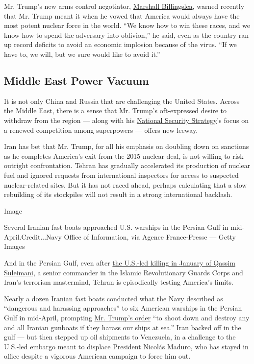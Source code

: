 Mr. Trump's new arms control negotiator,
\href{https://www.nytimes.com/2020/05/21/us/politics/trump-open-skies-treaty-arms-control.html}{Marshall
Billingslea}, warned recently that Mr. Trump meant it when he vowed that
America would always have the most potent nuclear force in the world.
``We know how to win these races, and we know how to spend the adversary
into oblivion,'' he said, even as the country ran up record deficits to
avoid an economic implosion because of the virus. ``If we have to, we
will, but we sure would like to avoid it.''

\hypertarget{middle-east-power-vacuum}{%
\subsection{Middle East Power Vacuum}\label{middle-east-power-vacuum}}

It is not only China and Russia that are challenging the United States.
Across the Middle East, there is a sense that Mr. Trump's oft-expressed
desire to withdraw from the region --- along with his
\href{https://www.whitehouse.gov/wp-content/uploads/2017/12/NSS-Final-12-18-2017-0905.pdf}{National
Security Strategy}'s focus on a renewed competition among superpowers
--- offers new leeway.

Iran has bet that Mr. Trump, for all his emphasis on doubling down on
sanctions as he completes America's exit from the 2015 nuclear deal, is
not willing to risk outright confrontation. Tehran has gradually
accelerated its production of nuclear fuel and ignored requests from
international inspectors for access to suspected nuclear-related sites.
But it has not raced ahead, perhaps calculating that a slow rebuilding
of its stockpiles will not result in a strong international backlash.

Image

Several Iranian fast boats approached U.S. warships in the Persian Gulf
in mid-April.Credit...Navy Office of Information, via Agence
France-Presse --- Getty Images

And in the Persian Gulf, even after
\href{https://www.nytimes.com/2020/01/02/world/middleeast/qassem-soleimani-iraq-iran-attack.html?searchResultPosition=1}{the
U.S.-led killing in January of Qassim Suleimani}, a senior commander in
the Islamic Revolutionary Guards Corps and Iran's terrorism mastermind,
Tehran is episodically testing America's limits.

Nearly a dozen Iranian fast boats conducted what the Navy described as
``dangerous and harassing approaches'' to six American warships in the
Persian Gulf in mid-April, prompting
\href{https://www.nytimes.com/2020/04/22/world/middleeast/iran-trump-navy-persian-gulf-satellite.html}{Mr.
Trump's order} ``to shoot down and destroy any and all Iranian gunboats
if they harass our ships at sea.'' Iran backed off in the gulf --- but
then stepped up oil shipments to Venezuela, in a challenge to the
U.S.-led embargo meant to displace President Nicolás Maduro, who has
stayed in office despite a vigorous American campaign to force him out.

